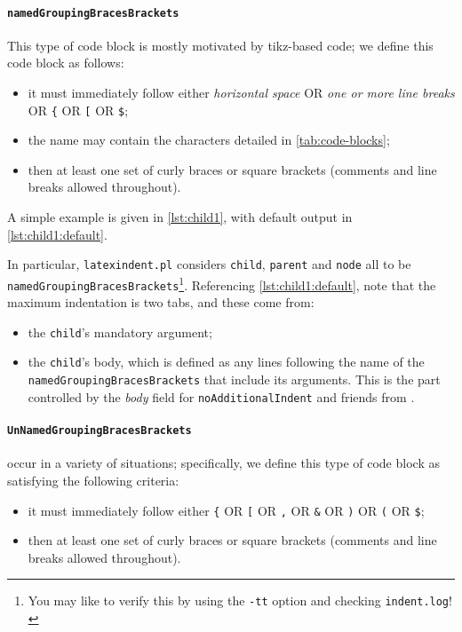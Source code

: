 	\paragraph{\texttt{namedGroupingBracesBrackets}}
		This type of code block is mostly motivated by tikz-based code; we define this code block as follows:
		\begin{itemize}
			\item it must immediately follow either \emph{horizontal space} OR \emph{one or more line breaks} OR \lstinline!{! OR \lstinline![!
			      OR \lstinline!$!;
			\item the name may contain the characters detailed in \vref{tab:code-blocks};
			\item then at least one set of curly braces or square brackets (comments and line breaks allowed throughout).
		\end{itemize}
		A simple example is given in \cref{lst:child1}, with default output in \cref{lst:child1:default}.

		\begin{minipage}{.45\textwidth}
		\end{minipage}%
		\hfill
		\begin{minipage}{.5\textwidth}
		\end{minipage}%

		In particular, \texttt{latexindent.pl} considers \texttt{child}, \texttt{parent} and \texttt{node} all to be \texttt{namedGroupingBracesBrackets}\footnote{
			You may like to verify this by using the \texttt{-tt} option and checking \texttt{indent.log}! }.
		Referencing \cref{lst:child1:default},
		note that the maximum indentation is two tabs, and these come from:
		\begin{itemize}
			\item the \lstinline!child!'s mandatory argument;
			\item the \lstinline!child!'s body, which is defined as any lines following the name of the \texttt{namedGroupingBracesBrackets}
			      that include its arguments. This is the part controlled by the \emph{body} field for \texttt{noAdditionalIndent}
			      and friends from .
		\end{itemize}

	\paragraph{\texttt{UnNamedGroupingBracesBrackets}} occur in a variety of situations; specifically, we define
		this type of code block as satisfying the following criteria:
		\begin{itemize}
			\item it must immediately follow either \lstinline!{! OR \lstinline![! OR \lstinline!,! OR \lstinline!&! OR \lstinline!)! OR \lstinline!(!
			      OR \lstinline!$!;
			\item then at least one set of curly braces or square brackets (comments and line breaks allowed throughout).
		\end{itemize}

